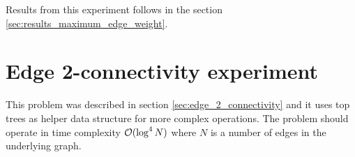 Results from this experiment follows in the section
\ref{sec:results_maximum_edge_weight}.


\section{Edge 2-connectivity experiment}
\label{sec:experiment_edge_2_connectivity}

This problem was described in section \ref{sec:edge_2_connectivity} and it uses
top trees as helper data structure for more complex operations. The problem
should operate in time complexity ${\cal O}(\log^4 N)$ where $N$ is a number of edges
in the underlying graph.


